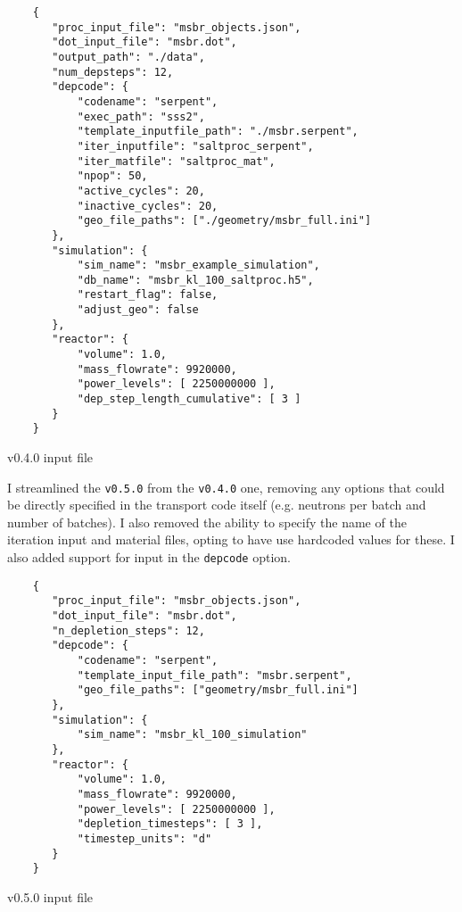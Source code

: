 \begin{listing}[!ht]
    \begin{verbatim}
    {
       "proc_input_file": "msbr_objects.json",
       "dot_input_file": "msbr.dot",
       "output_path": "./data",
       "num_depsteps": 12,
       "depcode": {
           "codename": "serpent",
           "exec_path": "sss2",
           "template_inputfile_path": "./msbr.serpent",
           "iter_inputfile": "saltproc_serpent",
           "iter_matfile": "saltproc_mat",
           "npop": 50,
           "active_cycles": 20,
           "inactive_cycles": 20,
           "geo_file_paths": ["./geometry/msbr_full.ini"]
       },
       "simulation": {
           "sim_name": "msbr_example_simulation",
           "db_name": "msbr_kl_100_saltproc.h5",
           "restart_flag": false,
           "adjust_geo": false
       },
       "reactor": {
           "volume": 1.0,
           "mass_flowrate": 9920000,
           "power_levels": [ 2250000000 ],
           "dep_step_length_cumulative": [ 3 ]
       }
    }
    \end{verbatim}
    \caption{\SaltProc v0.4.0 input file}
    \label{code:input-2}
\end{listing}

I streamlined the \SaltProc \verb,v0.5.0, from the \verb,v0.4.0, one,
removing any options that could be directly specified in the transport code
itself (e.g. neutrons per batch and number of batches). I also removed the
ability to specify the name of the iteration input and material files, opting to
have \SaltProc use hardcoded values for these. I also added support for
\OpenMC input in the \verb.depcode. option.

\begin{listing}[!ht]
    \begin{verbatim}
    {
       "proc_input_file": "msbr_objects.json",
       "dot_input_file": "msbr.dot",
       "n_depletion_steps": 12,
       "depcode": {
           "codename": "serpent",
           "template_input_file_path": "msbr.serpent",
           "geo_file_paths": ["geometry/msbr_full.ini"]
       },
       "simulation": {
           "sim_name": "msbr_kl_100_simulation"
       },
       "reactor": {
           "volume": 1.0,
           "mass_flowrate": 9920000,
           "power_levels": [ 2250000000 ],
           "depletion_timesteps": [ 3 ],
           "timestep_units": "d"
       }
    }
    \end{verbatim}
    \caption{\SaltProc v0.5.0 input file}
    \label{code:input-3}
\end{listing}
